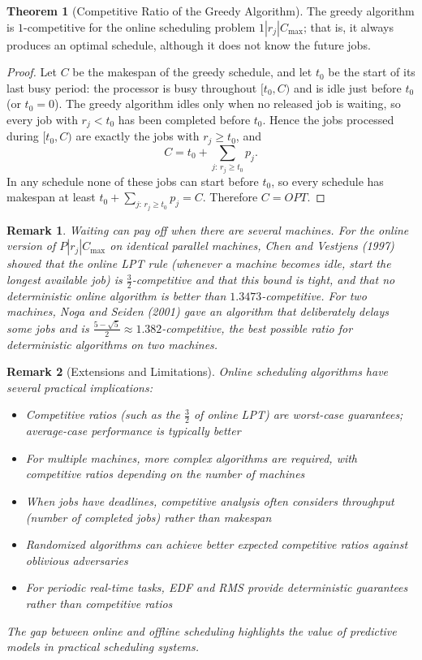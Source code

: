 \documentclass{article}
\newtheorem{remark}{Remark}
\theoremstyle{definition}
\newtheorem{theorem}{Theorem}
\begin{document}
\begin{theorem}[Competitive Ratio of the Greedy Algorithm]
The greedy algorithm is $1$-competitive for the online scheduling problem $1|r_j|C_{\max}$; that is, it always produces an optimal schedule, although it does not know the future jobs.

\begin{proof}
Let $C$ be the makespan of the greedy schedule, and let $t_0$ be the start of its last busy period: the processor is busy throughout $[t_0, C)$ and is idle just before $t_0$ (or $t_0 = 0$). The greedy algorithm idles only when no released job is waiting, so every job with $r_j < t_0$ has been completed before $t_0$. Hence the jobs processed during $[t_0, C)$ are exactly the jobs with $r_j \geq t_0$, and
\[
C = t_0 + \sum_{j:\, r_j \geq t_0} p_j .
\]
In any schedule none of these jobs can start before $t_0$, so every schedule has makespan at least $t_0 + \sum_{j:\, r_j \geq t_0} p_j = C$. Therefore $C = OPT$.
\end{proof}
\end{theorem}

\begin{remark}
Waiting can pay off when there are several machines. For the online version of $P|r_j|C_{\max}$ on identical parallel machines, Chen and Vestjens (1997) showed that the online LPT rule (whenever a machine becomes idle, start the longest available job) is $\frac{3}{2}$-competitive and that this bound is tight, and that no deterministic online algorithm is better than $1.3473$-competitive. For two machines, Noga and Seiden (2001) gave an algorithm that deliberately delays some jobs and is $\frac{5-\sqrt{5}}{2} \approx 1.382$-competitive, the best possible ratio for deterministic algorithms on two machines.
\end{remark}

\begin{remark}[Extensions and Limitations]
Online scheduling algorithms have several practical implications:
\begin{itemize}
    \item Competitive ratios (such as the $\frac{3}{2}$ of online LPT) are worst-case guarantees; average-case performance is typically better
    \item For multiple machines, more complex algorithms are required, with competitive ratios depending on the number of machines
    \item When jobs have deadlines, competitive analysis often considers throughput (number of completed jobs) rather than makespan
    \item Randomized algorithms can achieve better expected competitive ratios against oblivious adversaries
    \item For periodic real-time tasks, EDF and RMS provide deterministic guarantees rather than competitive ratios
\end{itemize}

The gap between online and offline scheduling highlights the value of predictive models in practical scheduling systems.
\end{remark}
\end{document}
